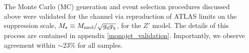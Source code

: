 \begin{table}[!htbp]
{%
}
\label{monojet_SRs}
\end{table}

The Monte Carlo (MC) generation and event selection procedures discussed above were validated for the \monojet channel via reproduction of ATLAS limits on the suppression scale, $M_{\star} \equiv M_{\mathrm{med}} / \sqrt{g_q g_{\chi}}$, for the $Z'$ model. The details of this process are contained in appendix \ref{monojet_validation}. Importantly, we observe agreement within $\sim$23\% for all samples.



